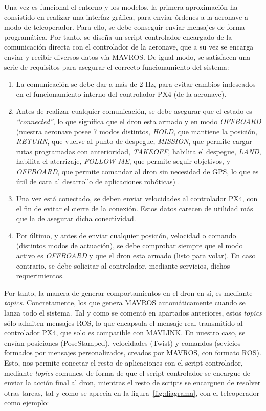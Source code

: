 Una vez es funcional el entorno y los modelos, la primera aproximación ha consistido en realizar una interfaz gráfica, para enviar órdenes a la aeronave a modo de teleoperador. Para ello, se debe conseguir enviar mensajes de forma programática. Por tanto, se diseña un script controlador encargado de la comunicación directa con el controlador de la aeronave, que a su vez se encarga enviar y recibir diversos datos vía MAVROS. De igual modo, se satisfacen una serie de requisitos para asegurar el correcto funcionamiento del sistema:

\begin{enumerate}
	\item La comunicación se debe dar a más de 2 Hz, para evitar cambios indeseados en el funcionamiento interno del controlador PX4 (de la aeronave).

	\item Antes de realizar cualquier comunicación, se debe asegurar que el estado es \emph{``connected''}, lo que significa que el dron esta armado y en modo \emph{OFFBOARD} (nuestra aeronave posee 7 modos distintos, \emph{HOLD}, que mantiene la posición, \emph{RETURN}, que vuelve al punto de despegue, \emph{MISSION}, que permite cargar rutas programadas con anterioridad, \emph{TAKEOFF}, habilita el despegue, \emph{LAND}, habilita el aterrizaje, \emph{FOLLOW ME}, que permite seguir objetivos, y \emph{OFFBOARD}, que permite comandar al dron sin necesidad de GPS, lo que es útil de cara al desarrollo de aplicaciones robóticas) \cite{flight-modes}.

    \item Una vez está conectado, se deben enviar velocidades al controlador PX4, con el fin de evitar el cierre de la conexión. Estos datos carecen de utilidad más que la de asegurar dicha conectividad.

    \item Por último, y antes de enviar cualquier posición, velocidad o comando (distintos modos de actuación), se debe comprobar siempre que el modo activo es \emph{OFFBOARD} y que el dron esta armado (listo para volar). En caso contrario, se debe solicitar al controlador, mediante servicios, dichos requerimientos.
\end{enumerate}

Por tanto, la manera de generar comportamientos en el dron en sí, es mediante \emph{topics}. Concretamente, los que genera MAVROS automáticamente cuando se lanza todo el sistema. Tal y como se comentó en apartados anteriores, estos \emph{topics} sólo admiten mensajes \ac{ROS}, lo que encapsula el mensaje real transmitido al controlador PX4, que solo es compatible con MAVLINK. En nuestro caso, se envían posiciones (PoseStamped), velocidades (Twist) y comandos (sevicios formados por mensajes personalizados, creados por MAVROS, con formato \ac{ROS}). Esto, nos permite conectar el resto de aplicaciones con el script controlador, mediante \emph{topics} comunes, de forma de que el script controlador se encargue de enviar la acción final al dron, mientras el resto de scripts se encarguen de resolver otras tareas, tal y como se aprecia en la figura~\ref{fig:diagrama}, con el teleoperador como ejemplo:\\

